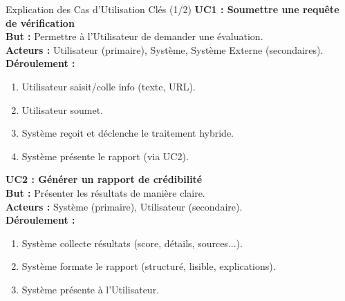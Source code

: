 \documentclass[9pt]{beamer}
\begin{document}
\begin{frame}{Explication des Cas d'Utilisation Clés (1/2)}
  \textbf{UC1 : Soumettre une requête de vérification} \\ %
  \textbf{But :} Permettre à l'Utilisateur de demander une évaluation. \\
  \textbf{Acteurs :} Utilisateur (primaire), Système, Système Externe (secondaires). \\
  \textbf{Déroulement :}
  \begin{enumerate}
    \item Utilisateur saisit/colle info (texte, URL).
    \item Utilisateur soumet.
    \item Système reçoit et déclenche le traitement hybride.
    \item Système présente le rapport (via UC2).
  \end{enumerate}

  \medskip %

  \textbf{UC2 : Générer un rapport de crédibilité} \\ %
  \textbf{But :} Présenter les résultats de manière claire. \\
  \textbf{Acteurs :} Système (primaire), Utilisateur (secondaire). \\
  \textbf{Déroulement :}
  \begin{enumerate}
    \item Système collecte résultats (score, détails, sources...).
    \item Système formate le rapport (structuré, lisible, explications).
    \item Système présente à l'Utilisateur.
  \end{enumerate}
\end{frame}
\end{document}
